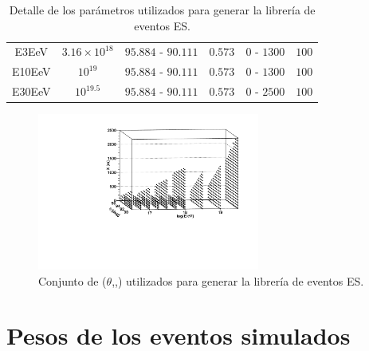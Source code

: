 \begin{table}
\begin{center}
\begin{tabular}{|c|c|cc|cc|}
				\multirow{2}{*}{E3EeV} & \multirow{2}{*}{$3.16\times10^{18}$} & \multirow{2}{*}{$95.884\text{ - }90.111$}  & \multirow{2}{*}{$0.573$} & \multirow{2}{*}{$0\text{ - }1300$} & \multirow{2}{*}{$100$}\\
				& & & & & \\
				
				\multirow{2}{*}{E10EeV} & \multirow{2}{*}{$10^{19}$} & \multirow{2}{*}{$95.884\text{ - }90.111$}  & \multirow{2}{*}{$0.573$} & \multirow{2}{*}{$0\text{ - }1300$} & \multirow{2}{*}{$100$} \\
				& & & & & \\
				
				\multirow{2}{*}{E30EeV} & \multirow{2}{*}{$10^{19.5}$} & \multirow{2}{*}{$95.884\text{ - }90.111$}  & \multirow{2}{*}{$0.573$} & \multirow{2}{*}{$0\text{ - }2500$} & \multirow{2}{*}{$100$} \\
				& & & & &\\
				\hline
				\end{tabular}
			\end{center}
			\caption{\label{tab:sim_table_es}
			Detalle de los parámetros utilizados para generar la librería de eventos ES.
			}
		\end{table}
		\begin{figure}[h!]
			\begin{center}
			\includegraphics[width=0.65\textwidth]{fig/simulacionAuger/3D_completeParameterSpace5}
			\caption{
			Conjunto de ($\theta$,\etau{},\xd{}) utilizados para generar la librería de eventos ES.
			}
			\label{fig:sim_fig_es}
			\end{center}
		\end{figure}
		
	\section{Pesos de los eventos simulados}
	\label{sc:pesos}
	
